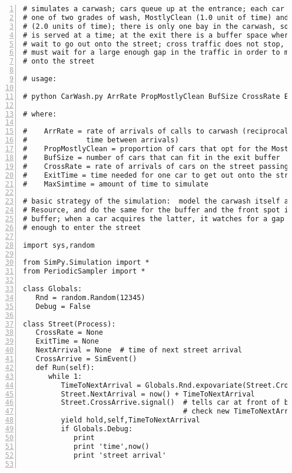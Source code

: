 \documentclass[11pt]{article}
\begin{document}
\begin{Verbatim}[fontsize=\relsize{-2},numbers=left]
# simulates a carwash; cars queue up at the entrance; each car chooses
# one of two grades of wash, MostlyClean (1.0 unit of time) and Gleaming
# (2.0 units of time); there is only one bay in the carwash, so only one
# is served at a time; at the exit there is a buffer space where cars
# wait to go out onto the street; cross traffic does not stop, so a car
# must wait for a large enough gap in the traffic in order to move out
# onto the street 

# usage:  

# python CarWash.py ArrRate PropMostlyClean BufSize CrossRate ExitTime MaxSimTime

# where:

#    ArrRate = rate of arrivals of calls to carwash (reciprocal of mean 
#              time between arrivals)
#    PropMostlyClean = proportion of cars that opt for the MostlyClean wash
#    BufSize = number of cars that can fit in the exit buffer
#    CrossRate = rate of arrivals of cars on the street passing the carwash
#    ExitTime = time needed for one car to get out onto the street
#    MaxSimtime = amount of time to simulate

# basic strategy of the simulation:  model the carwash itself as a
# Resource, and do the same for the buffer and the front spot in the
# buffer; when a car acquires the latter, it watches for a gap big
# enough to enter the street

import sys,random

from SimPy.Simulation import *
from PeriodicSampler import *

class Globals:
   Rnd = random.Random(12345)
   Debug = False

class Street(Process):
   CrossRate = None  
   ExitTime = None
   NextArrival = None  # time of next street arrival 
   CrossArrive = SimEvent()
   def Run(self):
      while 1:
         TimeToNextArrival = Globals.Rnd.expovariate(Street.CrossRate)
         Street.NextArrival = now() + TimeToNextArrival
         Street.CrossArrive.signal()  # tells car at front of buffer to 
                                      # check new TimeToNextArrival
         yield hold,self,TimeToNextArrival
         if Globals.Debug: 
            print 
            print 'time',now()
            print 'street arrival'


\end{Verbatim}
\end{document}
